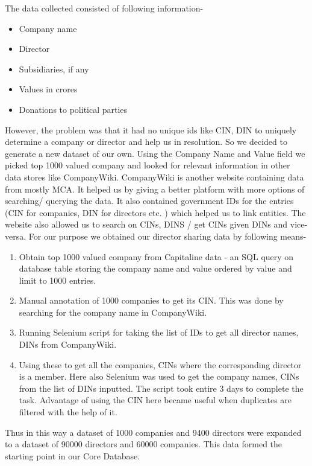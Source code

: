 
The data collected consisted of following information-
\begin{itemize}
    \item Company name
    \item Director
    \item Subsidiaries, if any
    \item Values in crores
    \item Donations to political parties
\end{itemize}

However, the problem was that it had no unique ids like CIN, DIN to uniquely determine a company or director and help us in resolution. So we decided to generate a new dataset of our own. Using the Company Name and Value field we picked top 1000 valued company and looked for relevant information in other data stores like CompanyWiki. 
CompanyWiki is another website containing data from mostly MCA. It helped us by giving a better platform with more options of searching/ querying the data. It also contained government IDs for the entries (CIN for companies, DIN for directors etc. ) which helped us to link entities. The website also allowed us to search on CINs, DINS  / get CINs given DINs and vice-versa. 
For our purpose we obtained our director sharing data by following means-

\begin{enumerate}
    \item Obtain top 1000 valued company from Capitaline data - an SQL query on database table storing the company name and value ordered by value and limit to 1000 entries.
    \item Manual annotation of 1000 companies to get its CIN. This was done by searching for the company name in CompanyWiki.
    \item Running Selenium script for taking the list of IDs to get all director names, DINs from CompanyWiki.
    \item Using these to get all the companies, CINs where the corresponding director is a member. Here also Selenium was used to get the company names, CINs from the list of DINs inputted. The script took entire 3 days to complete the task. Advantage of using the CIN here became useful when duplicates are filtered with the help of it.
\end{enumerate}

Thus in this way a dataset of 1000 companies and  9400 directors were expanded to a dataset of 90000 directors and 60000 companies. This data formed the starting point in our Core Database.

